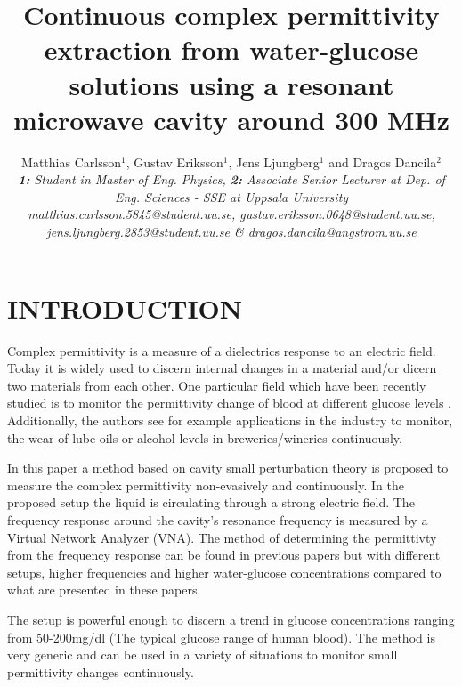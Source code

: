 \documentclass[10pt,final,conference,a4paper,twocolumn]{IEEEtran_AntennEMB_GigaHertz2016}
\begin{document}
\title{Continuous complex permittivity extraction from water-glucose solutions using a resonant microwave cavity around 300 MHz}

\author{Matthias Carlsson$^1$, Gustav Eriksson$^1$, Jens Ljungberg$^1$ and Dragos Dancila$^2$ \\
\em \small \textbf{1:} Student in Master of Eng. Physics, \textbf{2:} Associate Senior Lecturer at Dep. of Eng. Sciences - SSE at Uppsala University \\
\em \small matthias.carlsson.5845@student.uu.se, gustav.eriksson.0648@student.uu.se, \\
\em \small jens.ljungberg.2853@student.uu.se \& dragos.dancila@angstrom.uu.se
}

\maketitle
\section{INTRODUCTION}
 Complex permittivity is a measure of a dielectrics response to an electric field. Today it is widely used to discern internal changes in a material and/or dicern two materials from each other. One particular field which have been recently studied is to monitor the permittivity change of blood at different glucose levels \cite{c2}. Additionally,  the authors see for example applications in the industry to monitor, the wear of lube oils or alcohol levels in breweries/wineries continuously.
 
 In this paper a method based on cavity small perturbation theory \cite{c3} is proposed to measure the complex permittivity non-evasively and continuously. In the proposed setup the liquid is circulating through a strong electric field. The frequency response around the cavity's resonance frequency is measured by a Virtual Network Analyzer (VNA). The method of determining the permittivty from the frequency response can be found in previous papers \cite{c2}\cite{c1} but with different setups, higher frequencies and higher water-glucose concentrations compared to what are presented in these papers.
 
 The setup is powerful enough to discern a trend in glucose concentrations ranging from 50-200mg/dl (The typical glucose range of human blood). The method is very generic and can be used in a variety of situations to monitor small permittivity changes continuously.
\end{document}
